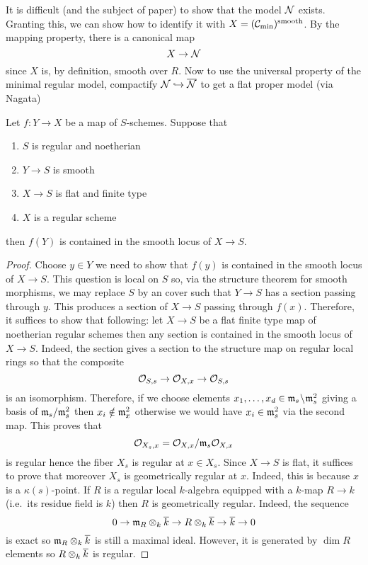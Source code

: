 \documentclass[12pt]{article}
\begin{document}
It is difficult (and the subject of  paper) to show that the \Neron model $\mathcal{N}$ exists. Granting this, we can show how to identify it with $X = (\mathcal{C}_{\min})^{\text{smooth}}$. By the \Neron mapping property, there is a canonical map
\[ X \to \mathcal{N} \]
since $X$ is, by definition, smooth over $R$. Now to use the universal property of the minimal regular model, compactify $\mathcal{N} \hookrightarrow \overline{\mathcal{N}}$ to get a flat proper model (via Nagata)  

\begin{lemma}
Let $f : Y \to X$ be a map of $S$-schemes. Suppose that
\begin{enumerate}
\item $S$ is regular and noetherian
\item $Y \to S$ is smooth
\item $X \to S$ is flat and finite type
\item $X$ is a regular scheme
\end{enumerate}
then $f(Y)$ is contained in the smooth locus of $X \to S$.
\end{lemma}

\begin{proof}
Choose $y \in Y$ we need to show that $f(y)$ is contained in the smooth locus of $X \to S$. This question is \etale local on $S$ so, via the structure theorem for smooth morphisms, we may replace $S$ by an \etale cover such that $Y \to S$ has a section passing through $y$. This produces a section of $X \to S$ passing through $f(x)$. Therefore, it suffices to show that following: let $X \to S$ be a flat finite type map of noetherian regular schemes then any section is contained in the smooth locus of $X \to S$. Indeed, the section gives a section to the structure map on regular local rings so that the composite
\[ \mathcal{O}_{S, s} \to \mathcal{O}_{X, x} \to \mathcal{O}_{S, s} \]
is an isomorphism. Therefore, if we choose elements $x_1, \dots, x_d \in \mathfrak{m}_s \! \setminus \! \mathfrak{m}_s^2$ giving a basis of $\mathfrak{m}_s / \mathfrak{m}_s^2$ then $x_i \notin \mathfrak{m}_x^2$ otherwise we would have $x_i \in \mathfrak{m}_s^2$ via the second map. This proves that 
\[ \mathcal{O}_{X_s, x} = \mathcal{O}_{X, x} / \mathfrak{m}_s \mathcal{O}_{X, x} \]
is regular hence the fiber $X_s$ is regular at $x \in X_s$. Since $X \to S$ is flat, it suffices to prove that moreover $X_s$ is geometrically regular at $x$. Indeed, this is because $x$ is a $\kappa(s)$-point. If $R$ is a regular local $k$-algebra equipped with a $k$-map $R \to k$ (i.e.\ its residue field is $k$) then $R$ is geometrically regular. Indeed, the sequence
\[ 0 \to \mathfrak{m}_R \otimes_k \overline{k} \to R \otimes_k \overline{k} \to \overline{k} \to 0 \]
is exact so $\mathfrak{m}_R \otimes_k \overline{k}$ is still a maximal ideal. However, it is generated by $\dim{R}$ elements so $R \otimes_k \overline{k}$ is regular. 
\end{proof}
\end{document}
